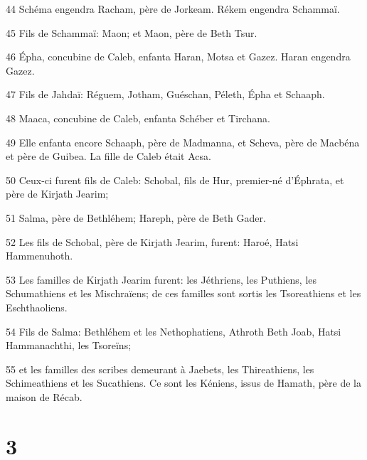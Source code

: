 \par 44 Schéma engendra Racham, père de Jorkeam. Rékem engendra Schammaï.
\par 45 Fils de Schammaï: Maon; et Maon, père de Beth Tsur.
\par 46 Épha, concubine de Caleb, enfanta Haran, Motsa et Gazez. Haran engendra Gazez.
\par 47 Fils de Jahdaï: Réguem, Jotham, Guéschan, Péleth, Épha et Schaaph.
\par 48 Maaca, concubine de Caleb, enfanta Schéber et Tirchana.
\par 49 Elle enfanta encore Schaaph, père de Madmanna, et Scheva, père de Macbéna et père de Guibea. La fille de Caleb était Acsa.
\par 50 Ceux-ci furent fils de Caleb: Schobal, fils de Hur, premier-né d'Éphrata, et père de Kirjath Jearim;
\par 51 Salma, père de Bethléhem; Hareph, père de Beth Gader.
\par 52 Les fils de Schobal, père de Kirjath Jearim, furent: Haroé, Hatsi Hammenuhoth.
\par 53 Les familles de Kirjath Jearim furent: les Jéthriens, les Puthiens, les Schumathiens et les Mischraïens; de ces familles sont sortis les Tsoreathiens et les Eschthaoliens.
\par 54 Fils de Salma: Bethléhem et les Nethophatiens, Athroth Beth Joab, Hatsi Hammanachthi, les Tsoreïns;
\par 55 et les familles des scribes demeurant à Jaebets, les Thireathiens, les Schimeathiens et les Sucathiens. Ce sont les Kéniens, issus de Hamath, père de la maison de Récab.

\chapter{3}


